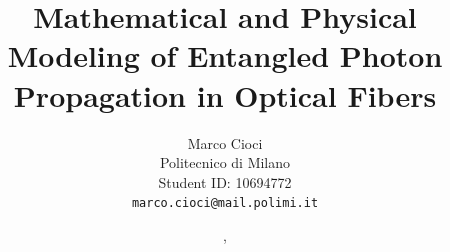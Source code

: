 
\title{
Mathematical and Physical Modeling of Entangled Photon Propagation in Optical Fibers
}

\author{
Marco Cioci\\
Politecnico di Milano\\
Student ID: 10694772\\
\texttt{marco.cioci@mail.polimi.it}
}

\date{\DTMenglishmonthname{\the\month}, \the\year}